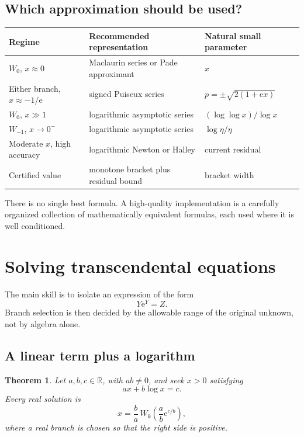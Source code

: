 \documentclass[11pt]{article}
\newtheorem{theorem}{Theorem}[section]
\theoremstyle{remark}
\newcommand{\ee}{\mathrm e}
\begin{document}
\subsection{Which approximation should be used?}

\begin{center}
\begin{tabularx}{.96\textwidth}{@{}lXl@{}}
\toprule
Regime & Recommended representation & Natural small parameter\\
\midrule
\(W_0\), \(x\approx0\) &
Maclaurin series or Pade approximant & \(x\)\\
Either branch, \(x\approx-1/\ee\) &
signed Puiseux series & \(p=\pm\sqrt{2(1+\ee x)}\)\\
\(W_0\), \(x\gg1\) &
logarithmic asymptotic series & \((\log\log x)/\log x\)\\
\(W_{-1}\), \(x\to0^-\) &
logarithmic asymptotic series & \(\log\eta/\eta\)\\
Moderate \(x\), high accuracy &
logarithmic Newton or Halley & current residual\\
Certified value &
monotone bracket plus residual bound & bracket width\\
\bottomrule
\end{tabularx}
\end{center}

There is no single best formula.  A high-quality implementation is a
carefully organized collection of mathematically equivalent formulas, each
used where it is well conditioned.


\section{Solving transcendental equations}\label{sec:equations}

The main skill is to isolate an expression of the form
\[
       Y\ee^Y=Z.
\]
Branch selection is then decided by the allowable range of the original
unknown, not by algebra alone.

\subsection{A linear term plus a logarithm}

\begin{theorem}\label{thm:axblogx}
Let \(a,b,c\in\mathbb R\), with \(ab\neq0\), and seek \(x>0\) satisfying
\[
       ax+b\log x=c.
\]
Every real solution is
\begin{equation}\label{eq:axblogx}
       x=\frac ba\,
       W_k\left(\frac ab\ee^{c/b}\right),
\end{equation}
where a real branch is chosen so that the right side is positive.
\end{theorem}
\end{document}
